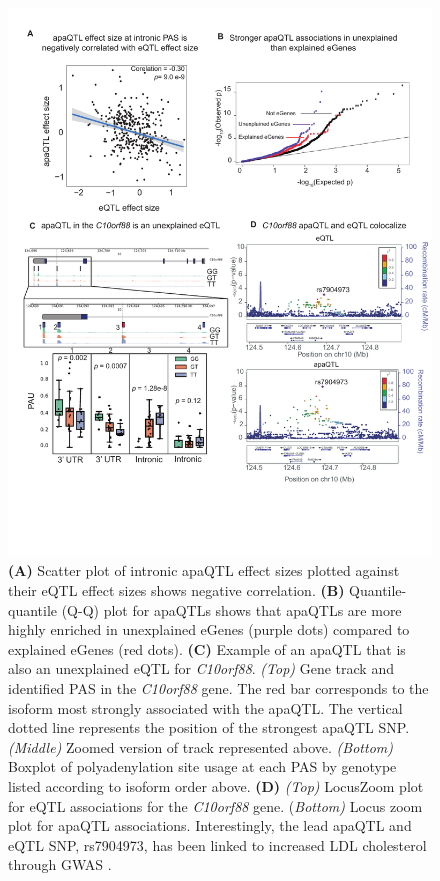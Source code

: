 \begin{figure}
\centering \includegraphics[width=5in]{img/ch02/figure3.pdf}
\caption[apaQTLs provide mechanistic evidence eQTLs ]{\small {\bf (A)} Scatter plot of intronic apaQTL effect sizes plotted against their eQTL effect sizes shows negative correlation. {\bf (B)} Quantile-quantile (Q-Q) plot for apaQTLs shows that apaQTLs are more highly enriched in unexplained eGenes (purple dots) compared to explained eGenes (red dots). {\bf (C)} Example of an apaQTL that is also an unexplained eQTL for {\it C10orf88}. {\it (Top)} Gene track and identified PAS in the {\it C10orf88} gene. The red bar corresponds to the isoform most strongly associated with the apaQTL. The vertical dotted line represents the position of the strongest apaQTL SNP. {\it (Middle)} Zoomed version of track represented above. {\it (Bottom)} Boxplot of polyadenylation site usage at each PAS by genotype listed according to isoform order above. {\bf (D)} {\it (Top)} LocusZoom plot for eQTL associations for the {\it C10orf88} gene. ({\it Bottom)} Locus zoom plot for apaQTL associations. Interestingly, the lead apaQTL and eQTL SNP, rs7904973, has been linked to increased LDL cholesterol through GWAS \cite{klarin_genetics_2018}.}
\label{fig:apaandexpression}
\end{figure}


